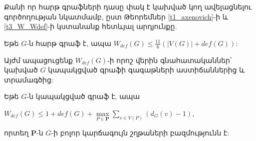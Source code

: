 Քանի որ հարթ գրաֆների դասը փակ է կախված կող ավելացնելու գործողության նկատմամբ, ըստ Թեորեմներ \ref{t1_axenovich}-ի և \ref{t3_W_Wdef}-ի կստանանք հետևյալ արդյունքը.

\begin{corollary}
\label{c3_Wdef_planar} Եթե $G$-ն հարթ գրաֆ է, ապա
$W_{def}(G)\leq \frac{11}{6}\left(\vert V(G)\vert +def(G)\right)$:
\end{corollary}

Այժմ ապացուցենք $W_{def}(G)$-ի որոշ վերին գնահատականներ՝ կախված $G$ կապակցված գրաֆի գագաթների աստիճաններից և տրամագծից:

\begin{theorem}
\label{t3_Wdef_paths} Եթե $G$-ն կապակցված գրաֆ է, ապա
\begin{center}
$W_{def}(G)\leq 1+def(G)+{\max\limits_{P\in
\mathbf{P}}}{\sum\limits_{v\in V(P)}}\left(d_{G}(v)-1\right)$,
\end{center}
որտեղ $\mathbf{P}$-ն $G$-ի բոլոր կարճագույն շղթաների բազմությունն է:
\end{theorem}
